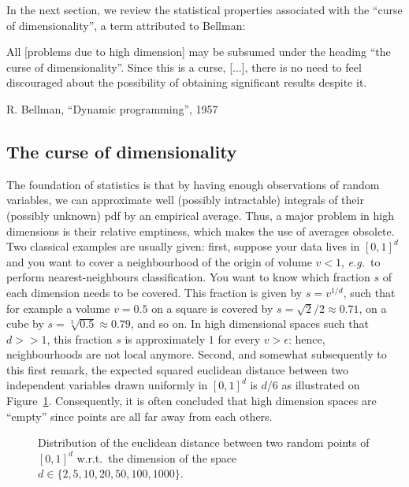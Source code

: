 \setlength{\epigraphwidth}{0.8\textwidth}

In the next section, we review the statistical properties associated with the ``curse of dimensionality'', a term attributed to Bellman:
\epigraph{All [problems due to high dimension] may be subsumed under the heading “the curse of dimensionality”. Since this is a curse, [...], there is no need to feel discouraged about the possibility of obtaining significant results despite it.}{R. Bellman, ``Dynamic programming'', 1957}

\subsection{The curse of dimensionality}

The foundation of statistics is that by having enough observations of random variables, we can approximate well (possibly intractable) integrals of their (possibly unknown) \gls{pdf} by an empirical average. Thus, a major problem in high dimensions is their relative emptiness, which makes the use of averages obsolete. Two classical examples are usually given: first, suppose your data lives in $[0,1]^d$ and you want to cover a neighbourhood of the origin of volume $v < 1$, \textit{e.g.}\ to perform nearest-neighbours classification. You want to know which fraction $s$ of each dimension needs to be covered. This fraction is given by $s = v^{1/d}$, such that for example a volume $v=0.5$ on a square is covered by $s = \sqrt{2}/2 \approx 0.71$, on a cube by $s = \sqrt[3]{0.5} \approx 0.79$, and so on. In high dimensional spaces such that $d>>1$, this fraction $s$ is approximately $1$ for every $v > \epsilon$: hence, neighbourhoods are not local anymore. Second, and somewhat subsequently to this first remark, the expected squared euclidean distance between two independent variables drawn uniformly in $[0,1]^d$ is $d/6$ as illustrated on Figure~\ref{fig:distance}. Consequently, it is often concluded that high dimension spaces are ``empty'' since points are all far away from each others.

\begin{figure}[!ht]
\centering
\resizebox{\textwidth}{!}{}
\caption{Distribution of the euclidean distance between two random points of $[0,1]^d$ w.r.t.\ the dimension of the space $d \in \{ 2, 5, 10, 20, 50, 100, 1000 \}$.}
\label{fig:distance}
\end{figure}


